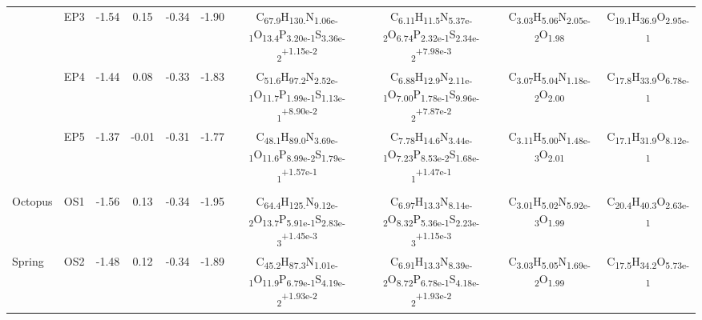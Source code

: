 \begin{landscape}
\begin{table}
\begin{adjustbox}{width=600pt,keepaspectratio}
\begin{threeparttable}
\begin{tabular}{lccccccccc}
      & EP3   & -1.54 & 0.15  & -0.34 & -1.90 & C\textsubscript{67.9}H\textsubscript{130.}N\textsubscript{1.06e-1}O\textsubscript{13.4}P\textsubscript{3.20e-1}S\textsubscript{3.36e-2}\textsuperscript{+1.15e-2} & C\textsubscript{6.11}H\textsubscript{11.5}N\textsubscript{5.37e-2}O\textsubscript{6.74}P\textsubscript{2.32e-1}S\textsubscript{2.34e-2}\textsuperscript{+7.98e-3} & C\textsubscript{3.03}H\textsubscript{5.06}N\textsubscript{2.05e-2}O\textsubscript{1.98} & C\textsubscript{19.1}H\textsubscript{36.9}O\textsubscript{2.95e-1} \\
      & EP4   & -1.44 & 0.08  & -0.33 & -1.83 & C\textsubscript{51.6}H\textsubscript{97.2}N\textsubscript{2.52e-1}O\textsubscript{11.7}P\textsubscript{1.99e-1}S\textsubscript{1.13e-1}\textsuperscript{+8.90e-2} & C\textsubscript{6.88}H\textsubscript{12.9}N\textsubscript{2.11e-1}O\textsubscript{7.00}P\textsubscript{1.78e-1}S\textsubscript{9.96e-2}\textsuperscript{+7.87e-2} & C\textsubscript{3.07}H\textsubscript{5.04}N\textsubscript{1.18e-2}O\textsubscript{2.00} & C\textsubscript{17.8}H\textsubscript{33.9}O\textsubscript{6.78e-1} \\
      & EP5   & -1.37 & -0.01 & -0.31 & -1.77 & C\textsubscript{48.1}H\textsubscript{89.0}N\textsubscript{3.69e-1}O\textsubscript{11.6}P\textsubscript{8.99e-2}S\textsubscript{1.79e-1}\textsuperscript{+1.57e-1} & C\textsubscript{7.78}H\textsubscript{14.6}N\textsubscript{3.44e-1}O\textsubscript{7.23}P\textsubscript{8.53e-2}S\textsubscript{1.68e-1}\textsuperscript{+1.47e-1} & C\textsubscript{3.11}H\textsubscript{5.00}N\textsubscript{1.48e-3}O\textsubscript{2.01} & C\textsubscript{17.1}H\textsubscript{31.9}O\textsubscript{8.12e-1} \\
      &       &       &       &       &       &       &       &       &  \\
Octopus & OS1   & -1.56 & 0.13  & -0.34 & -1.95 & C\textsubscript{64.4}H\textsubscript{125.}N\textsubscript{9.12e-2}O\textsubscript{13.7}P\textsubscript{5.91e-1}S\textsubscript{2.83e-3}\textsuperscript{+1.45e-3} & C\textsubscript{6.97}H\textsubscript{13.3}N\textsubscript{8.14e-2}O\textsubscript{8.32}P\textsubscript{5.36e-1}S\textsubscript{2.23e-3}\textsuperscript{+1.15e-3} & C\textsubscript{3.01}H\textsubscript{5.02}N\textsubscript{5.92e-3}O\textsubscript{1.99} & C\textsubscript{20.4}H\textsubscript{40.3}O\textsubscript{2.63e-1} \\
Spring & OS2   & -1.48 & 0.12  & -0.34 & -1.89 & C\textsubscript{45.2}H\textsubscript{87.3}N\textsubscript{1.01e-1}O\textsubscript{11.9}P\textsubscript{6.79e-1}S\textsubscript{4.19e-2}\textsuperscript{+1.93e-2} & C\textsubscript{6.91}H\textsubscript{13.3}N\textsubscript{8.39e-2}O\textsubscript{8.72}P\textsubscript{6.78e-1}S\textsubscript{4.18e-2}\textsuperscript{+1.93e-2} & C\textsubscript{3.03}H\textsubscript{5.05}N\textsubscript{1.69e-2}O\textsubscript{1.99} & C\textsubscript{17.5}H\textsubscript{34.2}O\textsubscript{5.73e-1} \\
\bottomrule
\end{tabular}%





\end{threeparttable}
\end{adjustbox}
\end{table}
\end{landscape}
